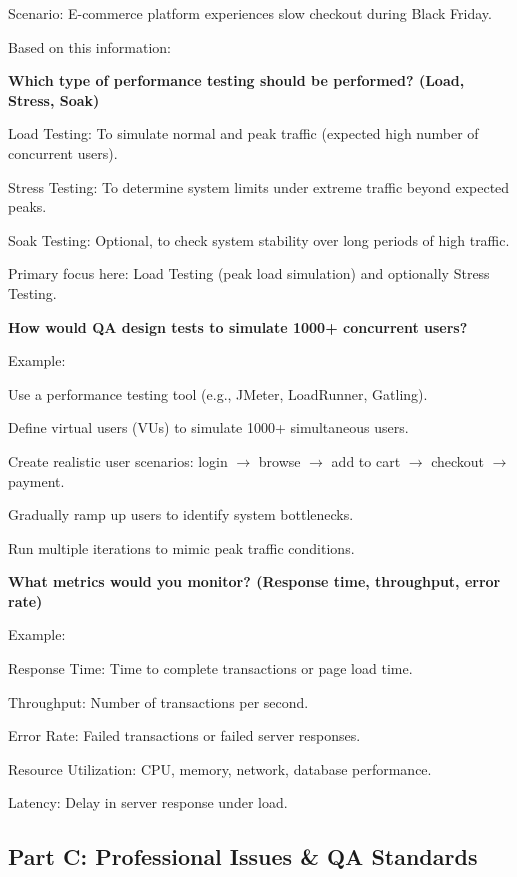 \indent 

Scenario: E-commerce platform experiences slow checkout during Black Friday.

Based on this information:

\bigskip

\noindent\textbf{Which type of performance testing should be performed? (Load, Stress, Soak)}

Load Testing: To simulate normal and peak traffic (expected high number of concurrent users).

Stress Testing: To determine system limits under extreme traffic beyond expected peaks.

Soak Testing: Optional, to check system stability over long periods of high traffic.

Primary focus here: Load Testing (peak load simulation) and optionally Stress Testing.

\bigskip

\noindent\textbf{How would QA design tests to simulate 1000+ concurrent users?}

Example:

Use a performance testing tool (e.g., JMeter, LoadRunner, Gatling).

Define virtual users (VUs) to simulate 1000+ simultaneous users.

Create realistic user scenarios: login $\rightarrow$ browse $\rightarrow$ add to cart $\rightarrow$ checkout $\rightarrow$ payment.

Gradually ramp up users to identify system bottlenecks.

Run multiple iterations to mimic peak traffic conditions.

\bigskip

\noindent\textbf{What metrics would you monitor? (Response time, throughput, error rate)}

Example:

Response Time: Time to complete transactions or page load time.

Throughput: Number of transactions per second.

Error Rate: Failed transactions or failed server responses.

Resource Utilization: CPU, memory, network, database performance.

Latency: Delay in server response under load.

\subsection{Part C: Professional Issues \& QA Standards}

